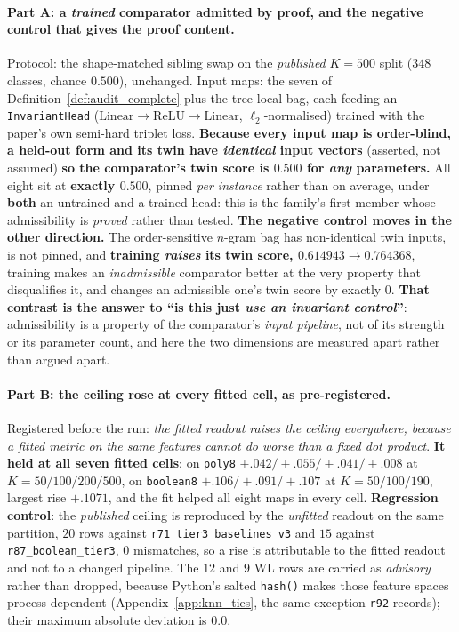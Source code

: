 \paragraph{Part A: a \emph{trained} comparator admitted by proof, and the negative control that gives the proof content.} Protocol: the shape-matched sibling swap on the \emph{published} $K{=}500$ split ($348$ classes, chance $0.500$), unchanged. Input maps: the seven of Definition~\ref{def:audit_complete} plus the tree-local bag, each feeding an \texttt{InvariantHead} ($\mathrm{Linear}\to\mathrm{ReLU}\to\mathrm{Linear}$, $\ell_2$-normalised) trained with the paper's own semi-hard triplet loss. \textbf{Because every input map is order-blind, a held-out form and its twin have \emph{identical} input vectors} (asserted, not assumed) \textbf{so the comparator's twin score is $0.500$ for \emph{any} parameters.} All eight sit at \textbf{exactly $\mathbf{0.500}$}, pinned \emph{per instance} rather than on average, under \textbf{both} an untrained and a trained head: this is the family's first member whose admissibility is \emph{proved} rather than tested. \textbf{The negative control moves in the other direction.} The order-sensitive $n$-gram bag has non-identical twin inputs, is not pinned, and \textbf{training \emph{raises} its twin score, $0.614943 \to 0.764368$}, training makes an \emph{inadmissible} comparator better at the very property that disqualifies it, and changes an admissible one's twin score by exactly $0$. \textbf{That contrast is the answer to ``is this just \emph{use an invariant control}''}: admissibility is a property of the comparator's \emph{input pipeline}, not of its strength or its parameter count, and here the two dimensions are measured apart rather than argued apart.

\paragraph{Part B: the ceiling rose at every fitted cell, as pre-registered.} Registered before the run: \emph{the fitted readout raises the ceiling everywhere, because a fitted metric on the same features cannot do worse than a fixed dot product}. \textbf{It held at all seven fitted cells}: on \texttt{poly8} $+.042/+.055/+.041/+.008$ at $K{=}50/100/200/500$, on \texttt{boolean8} $+.106/+.091/+.107$ at $K{=}50/100/190$, largest rise $\mathbf{+.1071}$, and the fit helped all eight maps in every cell. \textbf{Regression control}: the \emph{published} ceiling is reproduced by the \emph{unfitted} readout on the same partition, $20$ rows against \texttt{r71\_tier3\_baselines\_v3} and $15$ against \texttt{r87\_boolean\_tier3}, $0$ mismatches, so a rise is attributable to the fitted readout and not to a changed pipeline. The $12$ and $9$ WL rows are carried as \emph{advisory} rather than dropped, because Python's salted \texttt{hash()} makes those feature spaces process-dependent (Appendix~\ref{app:knn_ties}, the same exception \texttt{r92} records); their maximum absolute deviation is $0.0$.

